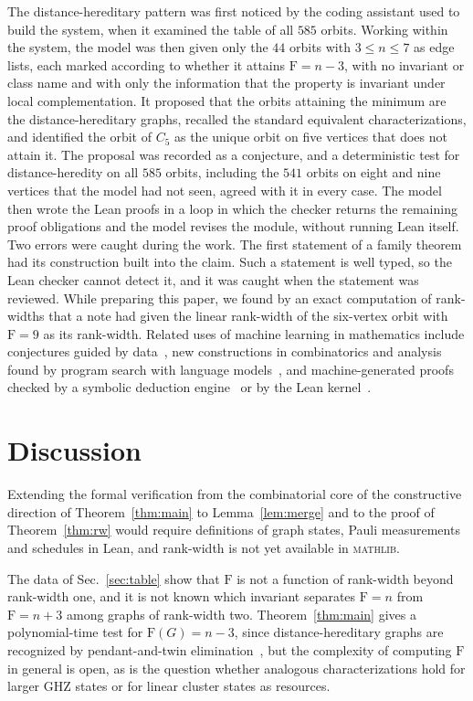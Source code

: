 \documentclass[aps,pra,onecolumn,superscriptaddress,nofootinbib,longbibliography]{revtex4-2}
\theoremstyle{plain}
\theoremstyle{remark}
\newcommand{\F}{\mathrm{F}}
\begin{document}
The distance-hereditary pattern was first noticed by the coding assistant used to build the system, when
it examined the table of all $585$ orbits. Working within the system, the model was then given only the
$44$ orbits with $3\le n\le 7$ as edge lists, each marked according to whether it attains $\F=n-3$, with no invariant or class name and with only the information
that the property is invariant under local complementation. It proposed that the orbits attaining the
minimum are the distance-hereditary graphs, recalled the standard equivalent characterizations, and
identified the orbit of $C_5$ as the unique orbit on five vertices that does not attain it. The proposal was
recorded as a conjecture, and a deterministic test for distance-heredity on all $585$ orbits, including the
$541$ orbits on eight and nine vertices that the model had not seen, agreed with it in every case. The
model then wrote the Lean proofs in a loop in which the checker returns the remaining proof obligations and
the model revises the module, without running Lean itself. Two errors were caught during the work.
The first statement of a family theorem had its construction built into the claim. Such a statement is
well typed, so the Lean checker cannot detect it, and it was caught when the statement was reviewed. While
preparing this paper, we found by an exact computation of rank-widths that a note had given the linear
rank-width of the six-vertex orbit with $\F=9$ as its rank-width. Related uses of machine learning in mathematics include conjectures guided by
data~\cite{Davies2021advancing}, new constructions in combinatorics and analysis found by program search with
language models~\cite{RomeraParedes2024mathematical,Novikov2025alphaevolve,Georgiev2025mathematical}, and
machine-generated proofs checked by a symbolic deduction engine~\cite{Trinh2024solving} or by the Lean
kernel~\cite{Hubert2026olympiad}.

\section{Discussion}\label{sec:discussion}

Extending the formal verification from the combinatorial core of the constructive direction of
Theorem~\ref{thm:main} to Lemma~\ref{lem:merge} and to the proof of Theorem~\ref{thm:rw} would require
definitions of graph states, Pauli measurements and schedules in Lean, and rank-width is not yet
available in \textsc{mathlib}.

The data of Sec.~\ref{sec:table} show that $\F$ is not a function of rank-width beyond rank-width one, and
it is not known which invariant separates $\F=n$ from $\F=n+3$ among graphs of rank-width two.
Theorem~\ref{thm:main} gives a polynomial-time test for $\F(G)=n-3$, since distance-hereditary graphs are
recognized by pendant-and-twin elimination~\cite{Bandelt1986distance}, but the complexity of computing $\F$
in general is open, as is the question whether analogous characterizations hold for larger GHZ states or
for linear cluster states as resources.
\end{document}
